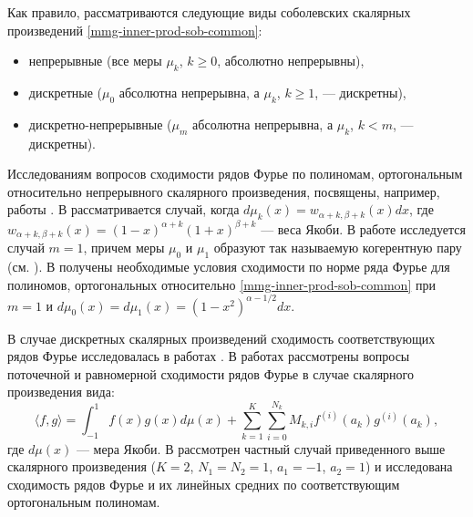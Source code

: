 Как правило, рассматриваются следующие виды соболевских скалярных произведений \eqref{mmg-inner-prod-sob-common}:
\begin{itemize}
	\item
	непрерывные (все меры $\mu_k$, $k \ge 0$, абсолютно непрерывны),
	\item
	дискретные ($\mu_0$ абсолютна непрерывна, а $\mu_k$, $k \ge 1$, --- дискретны),
	\item
	дискретно-непрерывные ($\mu_m$ абсолютна непрерывна, а $\mu_k$, $k < m$, --- дискретны).	
\end{itemize}

Исследованиям вопросов сходимости рядов Фурье по полиномам, ортогональным относительно непрерывного скалярного произведения, посвящены, например, работы \cite{mmg-MarcellanJacobiSobolev,mmg-CiaurriJacobiSobolev,mmg-CiaurriCoherentPairs,mmg-Fejzullahu2010,mmg-Fejzullahu2013}. В \cite{mmg-MarcellanJacobiSobolev,mmg-CiaurriJacobiSobolev} рассматривается случай, когда $d\mu_k(x)=w_{\alpha+k,\beta+k}(x)dx$, где $w_{\alpha+k,\beta+k}(x)=(1-x)^{\alpha+k}(1+x)^{\beta+k}$ --- веса Якоби. В работе \cite{mmg-CiaurriCoherentPairs} исследуется случай $m=1$, причем меры $\mu_0$ и $\mu_1$ образуют так называемую когерентную пару (см. \cite{mmg-IserlesKoch1991,mmg-MarcellanXu2015}). В \cite{mmg-Fejzullahu2010} получены необходимые условия сходимости по норме ряда Фурье для полиномов, ортогональных относительно \eqref{mmg-inner-prod-sob-common} при $m=1$ и $d\mu_0(x)=d\mu_1(x)=(1-x^2)^{\alpha-1/2}dx$.

В случае дискретных скалярных произведений сходимость соответствующих рядов Фурье исследовалась в работах \cite{mmg-Marcellan2002,mmg-Rocha2003,mmg-OsilenkerFourier2012,mmg-OsilenkerLinearMethods2015,mmg-Fejzullahu2009,mmg-CiaurriSigma2018}. В работах \cite{mmg-Marcellan2002,mmg-Rocha2003} рассмотрены вопросы поточечной и равномерной сходимости рядов Фурье в случае скалярного произведения вида:
\begin{equation*}
	\langle f,g \rangle = \int_{-1}^{1}f(x)g(x)d\mu(x)+
	\sum_{k=1}^K\sum_{i=0}^{N_k} M_{k,i}f^{(i)}(a_k)g^{(i)}(a_k),
\end{equation*}
где $d\mu(x)$ --- мера Якоби. В \cite{mmg-OsilenkerFourier2012,mmg-OsilenkerLinearMethods2015,mmg-Fejzullahu2009,mmg-CiaurriSigma2018} рассмотрен частный случай приведенного выше скалярного произведения ($K=2$, $N_1=N_2=1$, $a_1=-1$, $a_2=1$) и исследована сходимость рядов Фурье и их линейных средних по соответствующим ортогональным полиномам.

